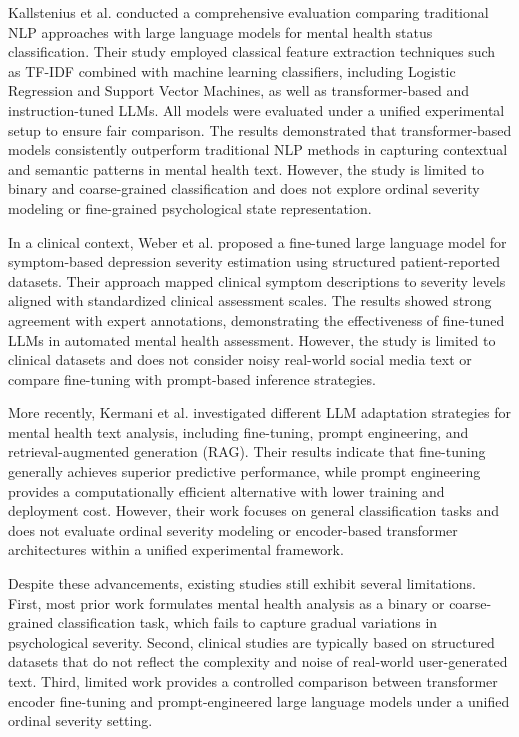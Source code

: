 \documentclass[conference]{IEEEtran}
\begin{document}
Kallstenius et al. \cite{Kallstenius2025} conducted a comprehensive evaluation comparing traditional NLP approaches with large language models for mental health status classification. Their study employed classical feature extraction techniques such as TF-IDF combined with machine learning classifiers, including Logistic Regression and Support Vector Machines, as well as transformer-based and instruction-tuned LLMs. All models were evaluated under a unified experimental setup to ensure fair comparison. The results demonstrated that transformer-based models consistently outperform traditional NLP methods in capturing contextual and semantic patterns in mental health text. However, the study is limited to binary and coarse-grained classification and does not explore ordinal severity modeling or fine-grained psychological state representation.

In a clinical context, Weber et al. \cite{Weber2025} proposed a fine-tuned large language model for symptom-based depression severity estimation using structured patient-reported datasets. Their approach mapped clinical symptom descriptions to severity levels aligned with standardized clinical assessment scales. The results showed strong agreement with expert annotations, demonstrating the effectiveness of fine-tuned LLMs in automated mental health assessment. However, the study is limited to clinical datasets and does not consider noisy real-world social media text or compare fine-tuning with prompt-based inference strategies.

More recently, Kermani et al. \cite{kermani-etal-2025-systematic} investigated different LLM adaptation strategies for mental health text analysis, including fine-tuning, prompt engineering, and retrieval-augmented generation (RAG). Their results indicate that fine-tuning generally achieves superior predictive performance, while prompt engineering provides a computationally efficient alternative with lower training and deployment cost. However, their work focuses on general classification tasks and does not evaluate ordinal severity modeling or encoder-based transformer architectures within a unified experimental framework.

Despite these advancements, existing studies still exhibit several limitations. First, most prior work formulates mental health analysis as a binary or coarse-grained classification task, which fails to capture gradual variations in psychological severity. Second, clinical studies are typically based on structured datasets that do not reflect the complexity and noise of real-world user-generated text. Third, limited work provides a controlled comparison between transformer encoder fine-tuning and prompt-engineered large language models under a unified ordinal severity setting.
\end{document}
